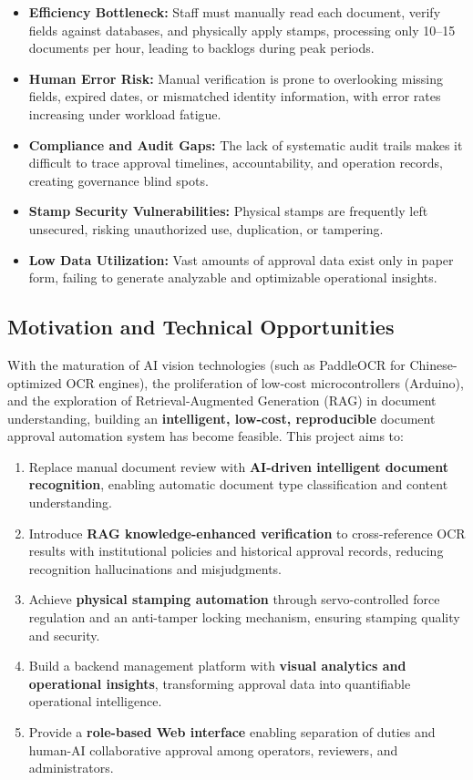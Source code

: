 \documentclass[conference]{IEEEtran}
\begin{document}
\begin{itemize}[leftmargin=*]
    \item \textbf{Efficiency Bottleneck:} Staff must manually read each document, verify fields against databases, and physically apply stamps, processing only 10--15 documents per hour, leading to backlogs during peak periods.
    \item \textbf{Human Error Risk:} Manual verification is prone to overlooking missing fields, expired dates, or mismatched identity information, with error rates increasing under workload fatigue.
    \item \textbf{Compliance and Audit Gaps:} The lack of systematic audit trails makes it difficult to trace approval timelines, accountability, and operation records, creating governance blind spots.
    \item \textbf{Stamp Security Vulnerabilities:} Physical stamps are frequently left unsecured, risking unauthorized use, duplication, or tampering.
    \item \textbf{Low Data Utilization:} Vast amounts of approval data exist only in paper form, failing to generate analyzable and optimizable operational insights.
\end{itemize}

\subsection{Motivation and Technical Opportunities}

With the maturation of AI vision technologies (such as PaddleOCR for Chinese-optimized OCR engines), the proliferation of low-cost microcontrollers (Arduino), and the exploration of Retrieval-Augmented Generation (RAG) in document understanding, building an \textbf{intelligent, low-cost, reproducible} document approval automation system has become feasible. This project aims to:

\begin{enumerate}[leftmargin=*]
    \item Replace manual document review with \textbf{AI-driven intelligent document recognition}, enabling automatic document type classification and content understanding.
    \item Introduce \textbf{RAG knowledge-enhanced verification} to cross-reference OCR results with institutional policies and historical approval records, reducing recognition hallucinations and misjudgments.
    \item Achieve \textbf{physical stamping automation} through servo-controlled force regulation and an anti-tamper locking mechanism, ensuring stamping quality and security.
    \item Build a backend management platform with \textbf{visual analytics and operational insights}, transforming approval data into quantifiable operational intelligence.
    \item Provide a \textbf{role-based Web interface} enabling separation of duties and human-AI collaborative approval among operators, reviewers, and administrators.
\end{enumerate}
\end{document}
